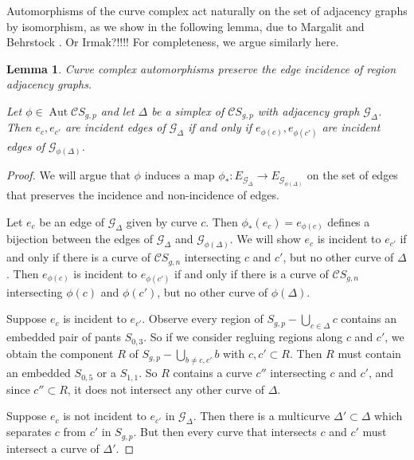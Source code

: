 \documentclass[11pt]{article}
\DeclareMathOperator{\aaut}{Aut}
\newtheorem{lemma}[theorem]{Lemma}
\theoremstyle{remark}
\theoremstyle{definition}
\begin{document}
Automorphisms
of the curve complex act naturally on the
set of adjacency graphs by isomorphism, as we show in the
following lemma, due to Margalit and Behrstock \cite{MR2239449}.
Or Irmak?!!!!
For completeness, we argue similarly here.

\begin{lemma}
  Curve complex automorphisms preserve the
  edge incidence of region adjacency graphs.

  Let $\phi \in \aaut \mathcal C S_{g,p}$
  and let $\Delta$ be a simplex of $\mathcal C S_{g,p}$
  with adjacency graph $\mathcal G_\Delta$.
  Then $e_c,e_{c'}$ are incident edges of $\mathcal G_\Delta$
  if and only if $e_{\phi(c)},e_{\phi(c')}$
  are incident edges of $\mathcal G_{\phi(\Delta)}$.
  \label{lemma:adjgraph}
\end{lemma}

\begin{proof}
  We will argue that $\phi$ induces a map
  $\phi_\ast : E_{\mathcal G_\Delta} \to E_{\mathcal G_{\phi(\Delta)}}$
  on the set of edges
  that preserves the incidence
  and non-incidence of edges.

  Let $e_c$ be an edge of $\mathcal G_\Delta$ given by curve $c$.
  Then $\phi_\ast (e_c) = e_{\phi(c)}$  defines a bijection
  between the edges of $\mathcal G_\Delta$ and $\mathcal G_{\phi(\Delta)}$.
  We will show $e_c$ is incident to $e_{c'}$ if
  and only if there is a curve of $\mathcal C S_{g,n}$
  intersecting $c$ and $c'$, but no other curve of $\Delta$.
  Then $e_{\phi(c)}$ is incident to $e_{\phi(c')}$
  if and only if there is a curve of $\mathcal C S_{g,n}$
  intersecting $\phi(c)$ and $\phi(c')$, but no other curve of $\phi(\Delta)$.

  Suppose $e_c$ is incident to $e_{c'}$.
  Observe every region  of
  $
  S_{g,p} - \bigcup_{c \in \Delta} c
  $
  contains an embedded pair of pants $S_{0,3}$.
  So if we consider regluing regions along $c$ and $c'$,
  we obtain the
  component $R$ of $
  S_{g,p} - \bigcup_{b\neq c,c'} b
  $
  with $c,c' \subset R$.
  Then $R$ must contain an embedded $S_{0,5}$
  or a $S_{1,1}$.
  So $R$ contains a curve $c''$ intersecting $c$ and $c'$,
  and since $c'' \subset R$, it does not intersect any other curve of $\Delta$.

  Suppose $e_c$ is not incident to $e_{c'}$ in $\mathcal G_{\Delta}$.
  Then there is a multicurve $\Delta' \subset \Delta$
  which separates $c$ from $c'$ in $S_{g,p}$.
  But then every curve that intersects $c$ and $c'$ must intersect a curve of $\Delta'$.
\end{proof}
\end{document}
